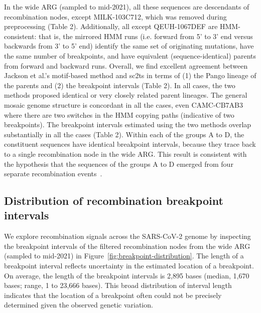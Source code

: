 \documentclass{article}
\begin{document}
In the wide ARG (sampled to mid-2021), all these sequences are descendants of
recombination nodes, except MILK-103C712, which was removed during
preprocessing (Table 2). Additionally, all except QEUH-1067DEF are HMM-consistent:
that is, the mirrored HMM runs (i.e. forward from 5’ to 3’ end versus backwards from 3’ to 5’ end)
identify the same set of originating mutations, have the same number of breakpoints, and have
equivalent (sequence-identical) parents from forward and backward runs.
Overall, we find excellent agreement between Jackson et al.'s
motif-based method and sc2ts in terms of (1) the Pango lineage of the parents
and (2) the breakpoint intervals (Table 2). In all cases, the two methods
proposed identical or very closely related parent lineages. The general mosaic
genome structure is concordant in all the cases, even CAMC-CB7AB3 where there
are two switches in the HMM copying paths (indicative of two breakpoints). The
breakpoint intervals estimated using the two methods overlap substantially in
all the cases (Table 2). Within each of the groups A to D, the constituent
sequences have identical breakpoint intervals, because they trace back to a
single recombination node in the wide ARG. This result is consistent with the
hypothesis that the sequences of the groups A to D emerged from four separate
recombination events~\cite{Jackson2021-ik}.

\subsection{Distribution of recombination breakpoint intervals}
\label{sec:breakpoint_intervals}


We explore recombination signals across the SARS-CoV-2 genome by inspecting the
breakpoint intervals of the filtered recombination nodes from the wide ARG
(sampled to mid-2021) in Figure~\ref{fig:breakpoint-distribution}. The length
of a breakpoint interval reflects uncertainty in the estimated location of a
breakpoint. On average, the length of the breakpoint intervals is 2,895 bases
(median, 1,670 bases; range, 1 to 23,666 bases). This broad distribution of
interval length indicates that the location of a breakpoint often could not be
precisely determined given the observed genetic variation.
\end{document}

